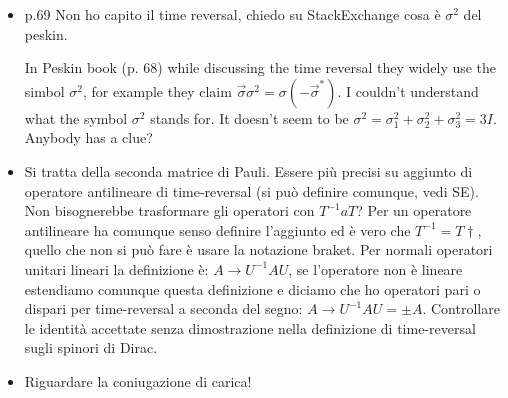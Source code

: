 \documentclass[10pt,a4paper]{article}
\begin{document}
\begin{itemize}
\item p.69 Non ho capito il time reversal, chiedo su StackExchange cosa è $\sigma^2$ del peskin.

In Peskin book (p. 68) while discussing the time reversal they widely use the simbol $\sigma^2$, for example they claim $\vec{\sigma} \sigma^2 = \sigma (-\vec{\sigma}^{*})$. I couldn't understand what the symbol $\sigma^2$ stands for. It doesn't seem to be $\sigma^2 = \sigma_{1}^{2} + \sigma_{2}^{2} + \sigma_{3}^{2} = 3I$. Anybody has a clue?

\item Si tratta della seconda matrice di Pauli. Essere più precisi su aggiunto di operatore antilineare di time-reversal (si può definire comunque, vedi SE). 
Non bisognerebbe trasformare gli operatori con $T^{-1} a T$? Per un operatore antilineare ha comunque senso definire l'aggiunto ed è vero che $T^{-1} = T \dagger$, quello che non si può fare è usare la notazione braket. 
Per normali operatori unitari lineari la definizione è: $A \rightarrow U^{-1} A U$, se l'operatore non è lineare estendiamo comunque questa definizione e diciamo che ho operatori pari o dispari per time-reversal a seconda del segno: $A \rightarrow U^{-1} A U = \pm A$. Controllare le identità accettate senza dimostrazione nella definizione di time-reversal sugli spinori di Dirac.

\item Riguardare la coniugazione di carica!


\end{itemize}
\end{document}

